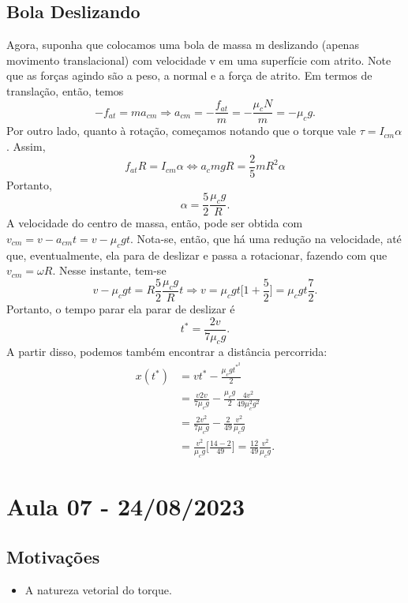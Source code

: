 \documentclass{article}
\begin{document}
  \subsection{Bola Deslizando}
    Agora, suponha que colocamos uma bola de massa m deslizando (apenas movimento translacional) com velocidade v em uma superfície com atrito. Note que as forças agindo são
  a peso, a normal e a força de atrito. Em termos de translação, então, temos 
    \[
      -f_{at} = ma_{cm} \Rightarrow a_{cm} = -\frac{f_{at}}{m} = -\frac{\mu_{c}N}{m} = -\mu_{c}g.
    \]
  Por outro lado, quanto à rotação, começamos notando que o torque vale \(\tau = I_{cm}\alpha \). Assim, 
  \[
    f_{at}R = I_{cm}\alpha \Longleftrightarrow a_{c}mgR = \frac{2}{5}mR^{2}\alpha
  \]
  Portanto, 
    \[
      \alpha = \frac{5}{2}\frac{\mu_{c}g}{R}.
    \]
  A velocidade do centro de massa, então, pode ser obtida com \(v_{cm} = v - a_{cm}t = v - \mu_{c}gt\). Nota-se, então,
que há uma redução na velocidade, até que, eventualmente, ela para de deslizar e passa a rotacionar, fazendo com que \(v_{cm} = \omega R\). 
Nesse instante, tem-se 
  \[
    v-\mu_{c}gt = R\frac{5}{2}\frac{\mu_{c}g}{R}t \Rightarrow v = \mu_{c}gt\biggl[1+\frac{5}{2}\biggr] = \mu_{c}gt \frac{7}{2}.
  \]
Portanto, o tempo parar ela parar de deslizar é 
  \[
    \boxed{t^{*} = \frac{2v}{7\mu_{c}g}.}
  \]
  A partir disso, podemos também encontrar a distância percorrida:
 \begin{align*}
   x(t^{*}) &= vt^{*} - \frac{\mu_{c}gt^{*^{2}}}{2}\\
            &= \frac{v2v}{7\mu_{c}g} - \frac{\mu_{c}g}{2}\frac{4v^{2}}{49\mu_{c}^{2}g^{2}}\\
            &= \frac{2v^{2}}{7\mu_{c}g} - \frac{2}{49}\frac{v^{2}}{\mu_{c}g}\\
            &= \frac{v^{2}}{\mu_{c}g}\biggl[\frac{14-2}{49}\biggr] = \boxed{\frac{12}{49}\frac{v^{2}}{\mu_{c}g}.}
 \end{align*}
 \newpage

\section{Aula 07 - 24/08/2023}
\subsection{Motivações} 
\begin{itemize}
  \item A natureza vetorial do torque. 
\end{itemize}
\end{document}
